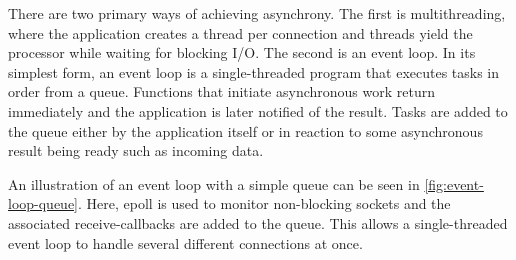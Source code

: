 There are two primary ways of achieving asynchrony. The first is multithreading,
where the application creates a thread per connection and threads yield
the processor while waiting for blocking I/O. The second is an event
loop. In its simplest form, an event loop is a single-threaded
program that executes tasks in order from a queue.
Functions that initiate asynchronous work return immediately and the
application is later notified of the result. 
Tasks are added to the queue either by the application itself or in
reaction to some asynchronous result being ready such as incoming
data.

An illustration of an event loop with a simple queue can be seen in
\cref{fig:event-loop-queue}. Here, epoll is used to monitor non-blocking
sockets and the associated receive-callbacks are added to the queue.
This allows a single-threaded event loop to handle
several different connections at once.

